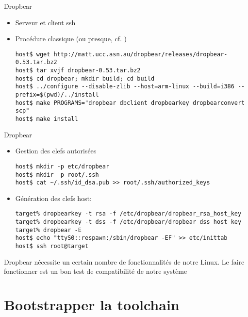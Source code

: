 \begin{frame}[fragile=singleslide]{Dropbear}
  \begin{itemize}
  \item Serveur et client ssh
  \item Procédure classique (ou presque, cf. )
    \begin{lstlisting}
host$ wget http://matt.ucc.asn.au/dropbear/releases/dropbear-0.53.tar.bz2
host$ tar xvjf dropbear-0.53.tar.bz2
host$ cd dropbear; mkdir build; cd build
host$ ../configure --disable-zlib --host=arm-linux --build=i386 --prefix=$(pwd)/../install
host$ make PROGRAMS="dropbear dbclient dropbearkey dropbearconvert scp"
host$ make install
    \end{lstlisting}
  \end{itemize}
\end{frame}

\begin{frame}[fragile=singleslide]{Dropbear}
  \begin{itemize}
  \item Gestion des clefs autorisées
    \begin{lstlisting}
host$ mkdir -p etc/dropbear
host$ mkdir -p root/.ssh
host$ cat ~/.ssh/id_dsa.pub >> root/.ssh/authorized_keys
    \end{lstlisting}%
  \item Génération des clefs host:
    \begin{lstlisting}
target% dropbearkey -t rsa -f /etc/dropbear/dropbear_rsa_host_key
target% dropbearkey -t dss -f /etc/dropbear/dropbear_dss_host_key
target% dropbear -E
host$ echo "ttyS0::respawn:/sbin/dropbear -EF" >> etc/inittab
host$ ssh root@target
    \end{lstlisting}
  \end{itemize}
  Dropbear  nécessite un  certain  nombre de  fonctionnalités de  notre
  Linux.  Le faire  fonctionner est  un bon  test de  compatibilité de
  notre système
\end{frame}

\section{Bootstrapper la toolchain}

